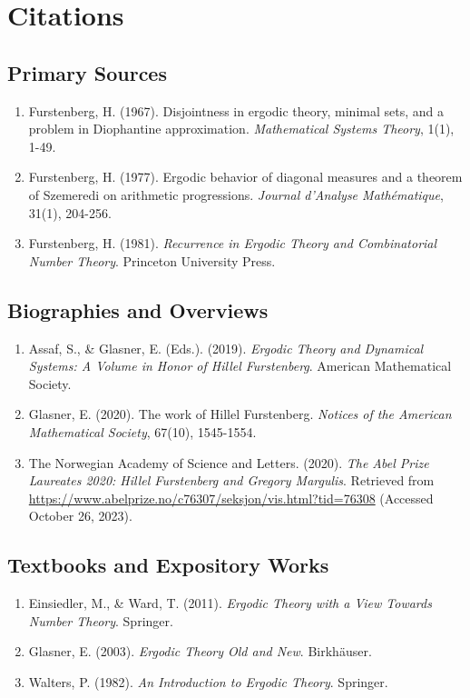 \section{Citations}

\subsection*{Primary Sources}
\begin{enumerate}
    \item Furstenberg, H. (1967). Disjointness in ergodic theory, minimal sets, and a problem in Diophantine approximation. \textit{Mathematical Systems Theory}, 1(1), 1-49.
    \item Furstenberg, H. (1977). Ergodic behavior of diagonal measures and a theorem of Szemeredi on arithmetic progressions. \textit{Journal d'Analyse Mathématique}, 31(1), 204-256.
    \item Furstenberg, H. (1981). \textit{Recurrence in Ergodic Theory and Combinatorial Number Theory}. Princeton University Press.
\end{enumerate}

\subsection*{Biographies and Overviews}
\begin{enumerate}
    \item Assaf, S., \& Glasner, E. (Eds.). (2019). \textit{Ergodic Theory and Dynamical Systems: A Volume in Honor of Hillel Furstenberg}. American Mathematical Society.
    \item Glasner, E. (2020). The work of Hillel Furstenberg. \textit{Notices of the American Mathematical Society}, 67(10), 1545-1554.
    \item The Norwegian Academy of Science and Letters. (2020). \textit{The Abel Prize Laureates 2020: Hillel Furstenberg and Gregory Margulis}. Retrieved from \url{https://www.abelprize.no/c76307/seksjon/vis.html?tid=76308} (Accessed October 26, 2023).
\end{enumerate}

\subsection*{Textbooks and Expository Works}
\begin{enumerate}
    \item Einsiedler, M., \& Ward, T. (2011). \textit{Ergodic Theory with a View Towards Number Theory}. Springer.
    \item Glasner, E. (2003). \textit{Ergodic Theory Old and New}. Birkhäuser.
    \item Walters, P. (1982). \textit{An Introduction to Ergodic Theory}. Springer.
\end{enumerate}
